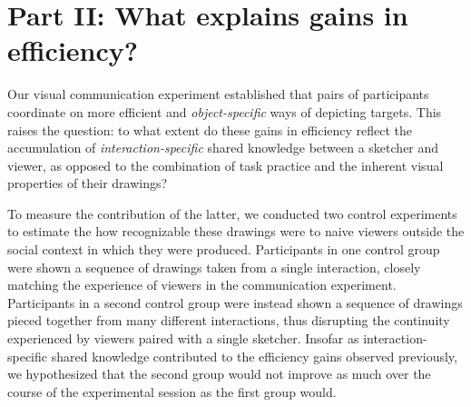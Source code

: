 \documentclass[10pt,letterpaper]{article}
\newcommand{\ndg}[1]{{\textcolor{Green}{[ndg: #1]}}}
\begin{document}

\section{Part II: What explains gains in efficiency?}

Our visual communication experiment established that pairs of participants coordinate on more efficient and \emph{object-specific} ways of depicting targets. %
This raises the question: to what extent do these gains in efficiency reflect the accumulation of \emph{interaction-specific} shared knowledge between a sketcher and viewer, as opposed to the combination of task practice and the inherent visual properties of their drawings?

To measure the contribution of the latter, we conducted two control experiments to estimate the how recognizable these drawings were to naive viewers outside the social context in which they were produced.
Participants in one control group were shown a sequence of drawings taken from a single interaction, closely matching the experience of viewers in the communication experiment.
Participants in a second control group were instead shown a sequence of drawings pieced together from many different interactions, thus disrupting the continuity experienced by viewers paired with a single sketcher.
Insofar as interaction-specific shared knowledge contributed to the efficiency gains observed previously, we hypothesized that the second group would not improve as much over the course of the experimental session as the first group would.

\end{document}
